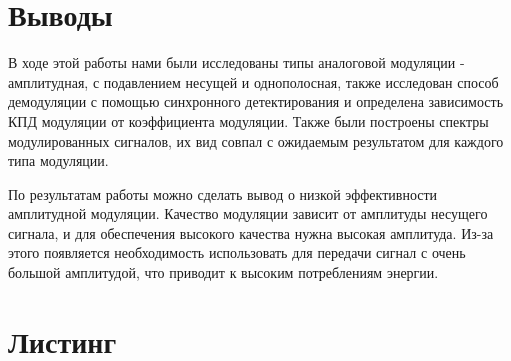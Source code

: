 \section{Выводы}

В ходе этой работы нами были исследованы типы аналоговой модуляции - амплитудная, с подавлением несущей и однополосная, также исследован способ демодуляции с помощью синхронного детектирования и определена зависимость КПД модуляции от коэффициента модуляции. Также были построены спектры модулированных сигналов, их вид совпал с ожидаемым результатом для каждого типа модуляции.

По результатам работы можно сделать вывод о низкой эффективности амплитудной модуляции. 
Качество модуляции зависит от амплитуды несущего сигнала, и для обеспечения высокого качества
нужна высокая амплитуда. Из-за этого появляется необходимость использовать для передачи сигнал с 
очень большой амплитудой, что приводит к высоким потреблениям энергии. 
\section{Листинг}


